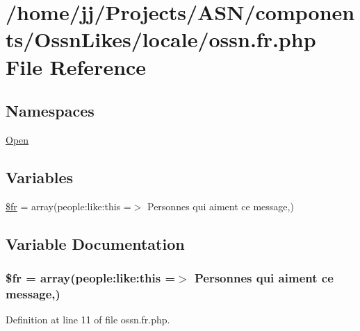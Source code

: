 \hypertarget{components_2_ossn_likes_2locale_2ossn_8fr_8php}{}\section{/home/jj/\+Projects/\+A\+S\+N/components/\+Ossn\+Likes/locale/ossn.fr.\+php File Reference}
\label{components_2_ossn_likes_2locale_2ossn_8fr_8php}
\subsection*{Namespaces}
\begin{DoxyCompactItemize}
\item 
 \hyperlink{namespace_open}{Open}
\end{DoxyCompactItemize}
\subsection*{Variables}
\begin{DoxyCompactItemize}
\item 
\hyperlink{components_2_ossn_likes_2locale_2ossn_8fr_8php_ad5107c697816e7b7f89ad1b3e94e3e0e}{\$fr} = array(\textquotesingle{}people\+:like\+:this\textquotesingle{} =$>$ \textquotesingle{}Personnes qui aiment ce message\textquotesingle{},)
\end{DoxyCompactItemize}


\subsection{Variable Documentation}
\subsubsection[{\texorpdfstring{\$fr}{$fr}}]{\setlength{\rightskip}{0pt plus 5cm}\$fr = array(\textquotesingle{}people\+:like\+:this\textquotesingle{} =$>$ \textquotesingle{}Personnes qui aiment ce message\textquotesingle{},)}\hypertarget{components_2_ossn_likes_2locale_2ossn_8fr_8php_ad5107c697816e7b7f89ad1b3e94e3e0e}{}\label{components_2_ossn_likes_2locale_2ossn_8fr_8php_ad5107c697816e7b7f89ad1b3e94e3e0e}


Definition at line 11 of file ossn.\+fr.\+php.

